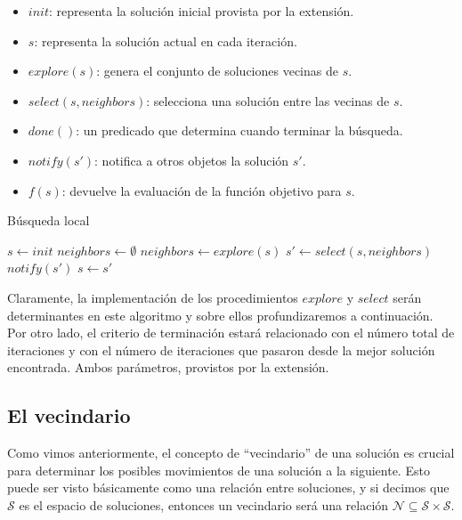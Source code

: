\begin{itemize}
 \item $init$: representa la soluci\'on inicial provista por la extensi\'on.
 \item $s$: representa la soluci\'on actual en cada iteraci\'on.
 \item $explore(s)$: genera el conjunto de soluciones vecinas de $s$.
 \item $select(s, neighbors)$: selecciona una soluci\'on entre las vecinas de
$s$.
 \item $done()$: un predicado que determina cuando terminar la b\'usqueda.
 \item $notify(s')$: notifica a otros objetos la soluci\'on $s'$.
 \item $f(s)$: devuelve la evaluaci\'on de la funci\'on objetivo para $s$.
\end{itemize}

\begin{algorithm}
 \caption{B\'usqueda local}
 \begin{algorithmic}[1]
  \STATE $s \leftarrow init$
  \STATE $neighbors \leftarrow \emptyset$
  \REPEAT
  \STATE $neighbors \leftarrow explore(s)$
  \STATE $s' \leftarrow select(s, neighbors)$  
  \STATE $notify(s')$
  \ENDIF
  \STATE $s \leftarrow s'$
 \end{algorithmic}
\end{algorithm}

Claramente, la implementaci\'on de los procedimientos $explore$ y $select$
ser\'an determinantes en este algoritmo y sobre ellos profundizaremos a
continuaci\'on. Por otro lado, el criterio de terminaci\'on estar\'a
relacionado con el n\'umero total de iteraciones y con el n\'umero de
iteraciones que pasaron desde la mejor soluci\'on encontrada. Ambos
par\'ametros, provistos por la extensi\'on.

\subsection{El vecindario}

Como vimos anteriormente, el concepto de ``vecindario'' de una soluci\'on es
crucial para determinar los posibles movimientos de una soluci\'on a la
siguiente. Esto puede ser visto b\'asicamente como una relaci\'on entre
soluciones, y si decimos que $\mathcal{S}$ es el espacio de soluciones, entonces
un vecindario ser\'a una relaci\'on $\mathcal{N} \subseteq \mathcal{S} \times
\mathcal{S}$.

